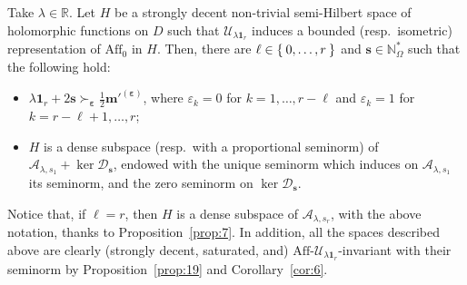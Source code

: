 \documentclass[10.5pt,reqno]{amsart}
\newcommand{\Aff}{\mathrm{Aff}}
\newcommand{\vect}[1]{\mathbf{{#1}}}
\newcommand{\N}{\mathds{N}}
\newcommand{\R}{\mathds{R}}
\newcommand{\epsb}{\mathbold{\eps}}
\newcommand{\Ac}{\mathcal{A}}
\newcommand{\Dc}{\mathcal{D}}
\newcommand{\Uc}{\mathcal{U}}
\newcommand{\eps}{\varepsilon}
\begin{document}
\begin{teo}\label{prop:11}
	Take $\lambda\in \R$.  Let $H$ be a strongly decent non-trivial semi-Hilbert space of holomorphic functions on $D$ such that $\Uc_{\lambda \vect 1_r}$ induces a bounded (resp.\ isometric) representation of $\Aff_0$ in $H$. Then, there are $\ell\in \Set{0,\dots, r}$ and $\vect s\in\N_{\Omega}^*$ such that the following hold:
	\begin{itemize}
		\item   $\lambda \vect 1_r+2\vect s \succ_{\epsb} \frac 1 2 \vect m'^{(\epsb)}$, where $\eps_k=0$ for $k=1,\dots,r-\ell$ and $\eps_k=1$ for $k=r-\ell+1,\dots, r$;
		
		\item $H$ is a dense subspace (resp.\ with a proportional seminorm) of $\Ac_{\lambda ,s_1}+\ker \Dc_{\vect s}$, endowed with the unique seminorm which induces on $\Ac_{\lambda ,s_1}$ its seminorm, and the zero seminorm on $\ker \Dc_{\vect s}$.
		\end{itemize}
\end{teo}

Notice that, if $\ell=r$, then $H$ is a dense subspace of $\Ac_{\lambda,s_r} $, with the above notation, thanks to Proposition~\ref{prop:7}. In addition, all the  spaces described above are clearly (strongly decent, saturated, and) $\Aff$-$\Uc_{\lambda\vect 1_r}$-invariant with their seminorm by Proposition~\ref{prop:19} and Corollary~\ref{cor:6}.
\end{document}
